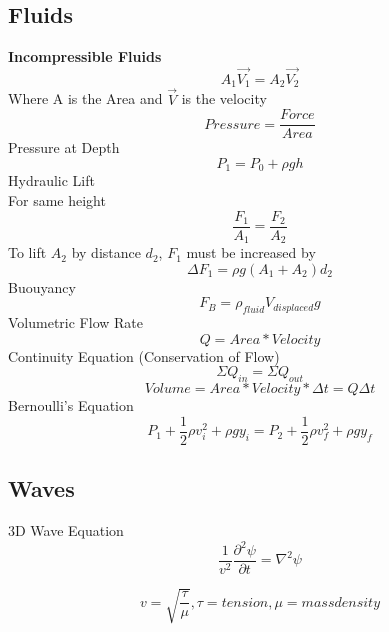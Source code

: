 \documentclass{article}
\begin{document}
{\subsection{Fluids}
{\bf{Incompressible Fluids}}\begin{equation}A_1\vec{V_1} = A_2\vec{V_2}\end{equation}
Where A is the Area and $\vec{V}$ is the velocity
\begin{equation}Pressure = \frac{Force}{Area}\end{equation}
Pressure at Depth
\begin{equation}P_{1} = P_{0} + \rho gh\end{equation}
Hydraulic Lift\\For same height\begin{equation} \frac{F_{1}}{A_{1}} = \frac{F_{2}}{A_{2}} \end{equation}
To lift $A_{2}$ by distance $d_{2}$, $F_{1}$ must be increased by
 \begin{equation} \Delta F_{1} = \rho g(A_{1} + A_{2})d_{2}\end{equation}
 Buouyancy
 \begin{equation}F_{B} = \rho_{fluid}V_{displaced}g\end{equation}
 Volumetric Flow Rate
  \begin{equation}Q = Area*Velocity\end{equation}
  Continuity Equation (Conservation of Flow)
  \begin{equation}\Sigma Q_{in} = \Sigma Q_{out} \end{equation}
  \begin{equation}Volume = Area*Velocity*\Delta t = Q\Delta t\end{equation}
Bernoulli's Equation
 \begin{equation}P_{1} + \frac{1}{2}\rho v_{i}^2 + \rho gy_{i} =P_{2} + \frac{1}{2}\rho v_{f}^2 + \rho gy_{f}\end{equation}

\subsection{Waves}
3D Wave Equation\begin{equation}\frac{1}{v^2} \frac{\partial^2\psi}{\partial t}= \nabla^2 \psi \end{equation}

\begin{equation}v=\sqrt{\frac{\tau}{\mu}},  \tau=tension, \mu=mass density \end{equation}

}
\end{document}
